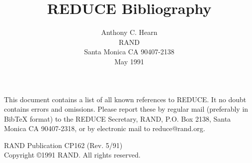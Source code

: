 %
%
\def\thebibliography#1{\section*{}\list
 {[\arabic{enumi}]}{\settowidth\labelwidth{[#1]}\leftmargin\labelwidth
 \advance\leftmargin\labelsep
 \usecounter{enumi}}
 \def\newblock{\hskip .11em plus .33em minus .07em}
 \sloppy\clubpenalty4000\widowpenalty4000
 \sfcode`\.=1000\relax}
\textwidth 6.6in\textheight 9in\columnwidth\textwidth
\hoffset-2cm

\setcounter{page}{0}
\title{REDUCE Bibliography}
\author{Anthony C. Hearn\\
RAND \\
Santa Monica CA 90407-2138  \vspace {.5cm} \\
May 1991}
\date{}
\maketitle
\vspace{1cm}
This document contains a list of all known references to REDUCE.  It no doubt
contains errors and omissions.  Please report these by regular mail
(preferably in BibTeX format) to the REDUCE Secretary, RAND, P.O. Box 2138,
Santa Monica CA 90407-2318, or by electronic mail to reduce@rand.org.
\begin{center}
\vspace{9.0cm}
RAND Publication CP162 (Rev. 5/91) \vspace*{.5cm} \\
Copyright \copyright 1991 RAND.  All rights reserved.
\end{center}
\newpage
\voffset-2.5cm


